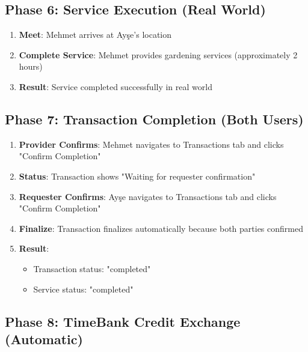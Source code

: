 \documentclass[12pt,a4paper]{report}
\begin{document}
\subsection{Phase 6: Service Execution (Real World)}

\begin{enumerate}
    \item \textbf{Meet}: Mehmet arrives at Ayşe's location
    \item \textbf{Complete Service}: Mehmet provides gardening services (approximately 2 hours)
    \item \textbf{Result}: Service completed successfully in real world
\end{enumerate}

\subsection{Phase 7: Transaction Completion (Both Users)}

\begin{enumerate}
    \item \textbf{Provider Confirms}: Mehmet navigates to Transactions tab and clicks "Confirm Completion"
    \item \textbf{Status}: Transaction shows "Waiting for requester confirmation"
    \item \textbf{Requester Confirms}: Ayşe navigates to Transactions tab and clicks "Confirm Completion"
    \item \textbf{Finalize}: Transaction finalizes automatically because both parties confirmed
    \item \textbf{Result}:
          \begin{itemize}
              \item Transaction status: "completed"
              \item Service status: "completed"
          \end{itemize}
\end{enumerate}

\subsection{Phase 8: TimeBank Credit Exchange (Automatic)}
\end{document}
